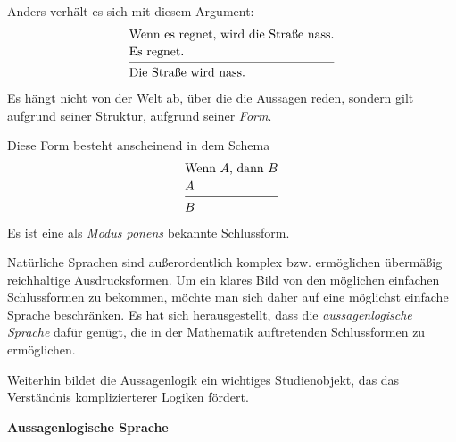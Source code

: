 \documentclass[8pt]{beamer}
\newcommand{\inferrulewidth}{0.4608pt}
\newcommand{\strong}[1]{\textsf{\textbf{#1}}}
\newcommand{\centerheadline}[1]{%
  \begin{center}\strong{#1}\end{center}}
\newcommand{\parspace}{\vspace{0.8em}}
\begin{document}
\begin{frame}
Anders verhält es sich mit diesem Argument:
\[\begin{array}{@{}l@{}}
\text{Wenn es regnet, wird die Straße nass.}\\[2pt]
\text{Es regnet.}\\
\midrule[\inferrulewidth]
\text{Die Straße wird nass.}
\end{array}\]
Es hängt nicht von der Welt ab, über die die Aussagen reden, sondern
gilt aufgrund seiner Struktur, aufgrund seiner \emph{Form}.\pause

\parspace
Diese Form besteht anscheinend in dem Schema
\[\begin{array}{@{}l@{}}
\text{Wenn $A$, dann $B$}\\[2pt]
\text{$A$}\\
\midrule[\inferrulewidth]
\text{$B$}
\end{array}\]
Es ist eine als \emph{Modus ponens} bekannte Schlussform.
\end{frame}

\begin{frame}
Natürliche Sprachen sind außerordentlich komplex bzw. ermöglichen
übermäßig reichhaltige Ausdrucksformen. Um ein klares Bild von den
möglichen einfachen Schlussformen zu bekommen, möchte man sich daher
auf eine möglichst einfache Sprache beschränken. Es hat sich
herausgestellt, dass die \emph{aussagenlogische Sprache} dafür genügt,
die in der Mathematik auftretenden Schlussformen zu ermöglichen.\pause

\parspace
Weiterhin bildet die Aussagenlogik ein wichtiges Studienobjekt, das
das Verständnis komplizierterer Logiken fördert.
\end{frame}

\begin{frame}
\centerheadline{Aussagenlogische Sprache}
\end{frame}
\end{document}
